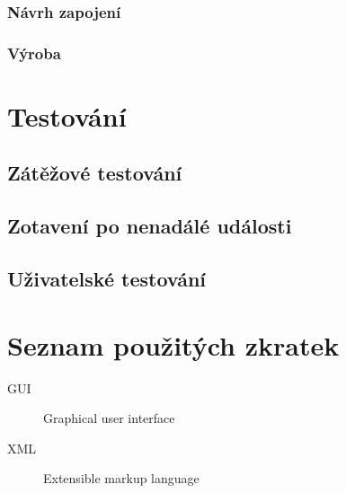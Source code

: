 \documentclass[thesis=B,czech]{FITthesis}[2019/12/23]
\begin{document}
\subsection{Návrh zapojení}

\subsection{Výroba}



\chapter{Testování}

\section{Zátěžové testování}

\section{Zotavení po nenadálé události}

\section{Uživatelské testování}



\begin{conclusion}
\end{conclusion}




\appendix

\chapter{Seznam použitých zkratek}
\begin{description}
    \item[GUI] Graphical user interface
    \item[XML] Extensible markup language
\end{description}
\end{document}
